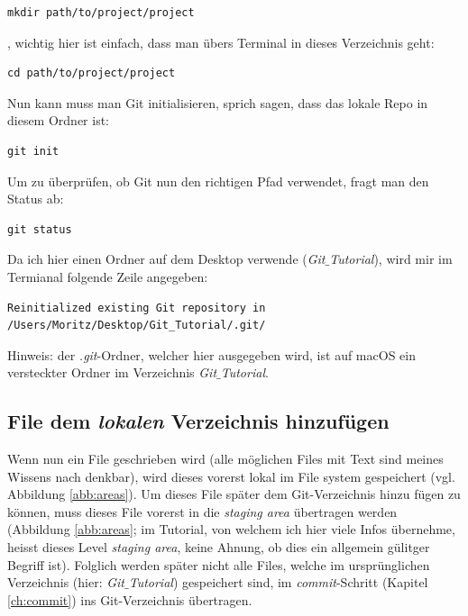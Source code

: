 \documentclass[twoside, 11pr]{article}
\begin{document}
\begin{lstlisting}
mkdir path/to/project/project
\end{lstlisting}

\noindent
, wichtig hier ist einfach, dass man übers Terminal in dieses Verzeichnis geht:

\begin{lstlisting}
cd path/to/project/project
\end{lstlisting}

\noindent
Nun kann muss man Git initialisieren, sprich sagen, dass das lokale Repo in diesem Ordner ist:

\begin{lstlisting}
git init
\end{lstlisting}

\noindent
Um zu überprüfen, ob Git nun den richtigen Pfad verwendet, fragt man den Status ab:

\begin{lstlisting}
git status
\end{lstlisting}

\noindent
Da ich hier einen Ordner auf dem Desktop verwende (\textit{Git$\_$Tutorial}), wird mir im Termianal folgende Zeile angegeben:

\begin{lstlisting}
Reinitialized existing Git repository in /Users/Moritz/Desktop/Git_Tutorial/.git/
\end{lstlisting}

\noindent
Hinweis: der \textit{.git}-Ordner, welcher hier ausgegeben wird, ist auf macOS ein versteckter Ordner im Verzeichnis \textit{Git$\_$Tutorial}.

\subsection{File dem \textit{lokalen} Verzeichnis hinzufügen}\label{ch:push}

Wenn nun ein File geschrieben wird (alle möglichen Files mit Text sind meines Wissens nach denkbar), wird dieses vorerst lokal im File system gespeichert (vgl. Abbildung \ref{abb:areas}). Um dieses File später dem Git-Verzeichnis hinzu fügen zu können, muss dieses File vorerst in die \textit{staging area} übertragen werden (Abbildung \ref{abb:areas}; im Tutorial, von welchem ich hier viele Infos übernehme, heisst dieses Level \textit{staging area}, keine Ahnung, ob dies ein allgemein gülitger Begriff ist). Folglich werden später nicht alle Files, welche im ursprünglichen Verzeichnis (hier: \textit{Git$\_$Tutorial}) gespeichert sind, im \textit{commit}-Schritt (Kapitel \ref{ch:commit}) ins Git-Verzeichnis übertragen.
\end{document}
